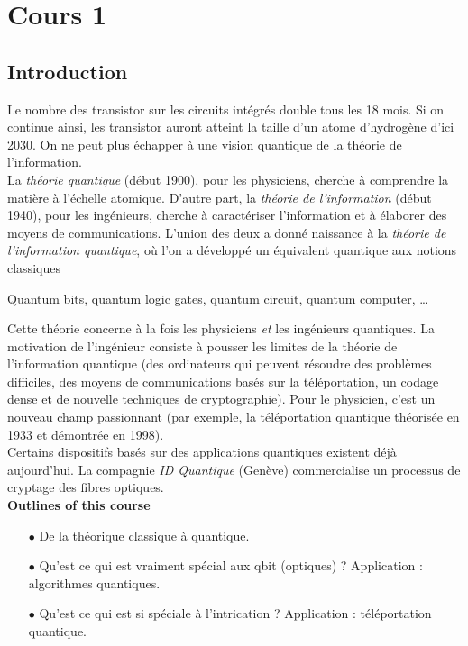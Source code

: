 \chapter{Cours 1}
\section{Introduction}
Le nombre des transistor sur les circuits intégrés double tous les 18 mois. Si on continue
ainsi, les transistor auront atteint la taille d'un atome d'hydrogène d'ici 2030. On ne
peut plus échapper à une vision quantique de la théorie de l'information.\\

La \textit{théorie quantique} (début 1900), pour les physiciens, cherche à comprendre 
la matière à l'échelle atomique. D'autre part, la \textit{théorie de l'information}
(début 1940), pour les ingénieurs, cherche à caractériser l'information et à élaborer des
moyens de communications. L'union des deux a donné naissance à la \textit{théorie de 
l'information quantique}, où l'on a développé un équivalent quantique aux notions 
classiques
\begin{center}
Quantum bits, quantum logic gates, quantum circuit,  quantum computer, \dots
\end{center}
Cette théorie concerne à la fois les physiciens \textit{et} les ingénieurs quantiques.
La motivation de l'ingénieur consiste à pousser les limites de la théorie de l'information
quantique (des ordinateurs qui peuvent résoudre des problèmes difficiles, des moyens
de communications basés sur la téléportation, un codage dense et de nouvelle techniques
de cryptographie). Pour le physicien, c'est un nouveau champ passionnant (par exemple,
la téléportation quantique théorisée en 1933 et démontrée en 1998).\\

Certains dispositifs basés sur des applications quantiques existent déjà aujourd'hui. 
La compagnie \textit{ID Quantique} (Genève) commercialise un processus de cryptage
des fibres optiques.\\

\textbf{Outlines of this course}
\begin{itemize}
\item[$\bullet$] De la théorique classique à quantique.
\item[$\bullet$] Qu'est ce qui est vraiment spécial aux qbit (optiques) ? Application :
algorithmes quantiques.
\item[$\bullet$] Qu'est ce qui est si spéciale à l’intrication ? Application : 
téléportation quantique.
\end{itemize}
\newpage
